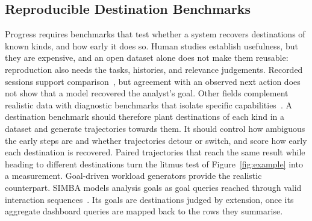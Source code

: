 \documentclass[sigconf]{acmart}
\begin{document}
\subsection{Reproducible Destination Benchmarks}
Progress requires benchmarks that test whether a system recovers destinations of known kinds, and how early it does so. Human studies establish usefulness, but they are expensive, and an open dataset alone does not make them reusable: reproduction also needs the tasks, histories, and relevance judgements. Recorded sessions support comparison~\cite{dezoysa2025exploract}, but agreement with an observed next action does not show that a model recovered the analyst's goal. Other fields complement realistic data with diagnostic benchmarks that isolate specific capabilities~\cite{johnson2017clevr,ribeiro2020beyond}. A destination benchmark should therefore plant destinations of each kind in a dataset and generate trajectories towards them. It should control how ambiguous the early steps are and whether trajectories detour or switch, and score how early each destination is recovered. Paired trajectories that reach the same result while heading to different destinations turn the litmus test of Figure~\ref{fig:example} into a measurement. Goal-driven workload generators provide the realistic counterpart. SIMBA models analysis goals as goal queries reached through valid interaction sequences~\cite{purichAdaptiveBenchmarkModeling2025}. Its goals are destinations judged by extension, once its aggregate dashboard queries are mapped back to the rows they summarise.

\end{document}
